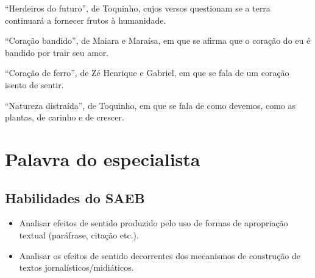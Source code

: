 \begin{escolha}
\item ``Herdeiros do futuro'', de Toquinho, cujos versos questionam se a
terra continuará a fornecer frutos à humanidade.
\item ``Coração bandido'', de Maiara e Maraísa, em que se afirma que o
coração do eu é bandido por trair seu amor.
\item ``Coração de ferro'', de Zé Henrique e Gabriel, em que se fala de um
coração isento de sentir.
\item ``Natureza distraída'', de Toquinho, em que se fala de como devemos,
como as plantas, de carinho e de crescer.
\end{escolha}



\chapter{Palavra do especialista}

\vspace*{-.5cm}
\enlargethispage{3\baselineskip}

\section*{Habilidades do SAEB}
\begin{itemize}
\item Analisar efeitos de sentido produzido pelo uso de
formas de apropriação textual (paráfrase, citação etc.).
\item Analisar os
efeitos de sentido decorrentes dos mecanismos de construção de textos
jornalísticos/midiáticos.
\end{itemize}

